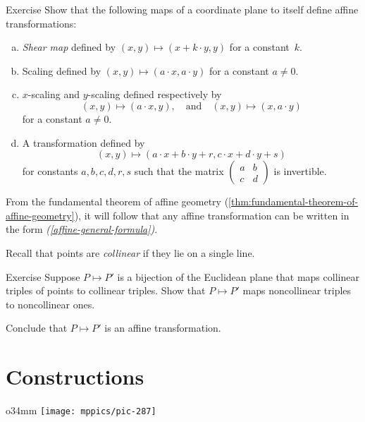 \begin{thm}{Exercise}\label{ex:afine-linear}
Show that the following maps of a coordinate plane to itself define affine transformations:
\begin{enumerate}[(a)]
\item\label{ex:afine-linear:shear} \emph{Shear map} defined by $(x,y)\mapsto (x+k\cdot y,y)$ for a constant~$k$.
\item\label{ex:afine-linear:scaling} Scaling defined by $(x,y)\mapsto (a\cdot x,a\cdot y)$ for a constant $a\ne 0$.
\item $x$-scaling and $y$-scaling defined respectively by 
\[(x,y)\mapsto (a\cdot x,y),\quad\text{and}\quad(x,y)\mapsto (x,a\cdot y)\]
for a constant $a\ne 0$.
\item\label{affine-general-formula} A transformation defined by
\[(x,y)\mapsto(a\cdot x+b\cdot y+r,c\cdot x+d\cdot y+s)\]
for constants $a,b,c,d,r,s$ such that the matrix $(\begin{smallmatrix}a&b\\c&d\end{smallmatrix})$ is invertible. 
\end{enumerate}
\end{thm}

From the fundamental theorem of affine geometry (\ref{thm:fundamental-theorem-of-affine-geometry}), it will follow that any affine transformation can be written in the form \textit{(\ref{affine-general-formula})}.

Recall that points are \emph{collinear} if they lie on a single line.

\begin{thm}{Exercise}\label{ex:collinear=affine}
Suppose $P\mapsto P'$ is a bijection of the Euclidean plane that maps collinear triples of points to collinear triples.
Show that $P\mapsto P'$ maps noncollinear triples to noncollinear ones.

Conclude that $P\mapsto P'$ is an affine transformation.
\end{thm}


\section{Constructions}

\begin{wrapfigure}{o}{34mm}
\vskip-10mm
\centering
\texttt{[image: mppics/pic-287]}
\end{wrapfigure}

